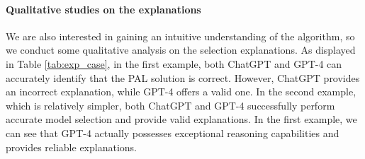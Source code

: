\documentclass[11pt]{article}
\begin{document}
\paragraph{Qualitative studies on the explanations}
We are also interested in gaining an intuitive understanding of the algorithm, so we conduct some qualitative analysis on the selection explanations. As displayed in Table \ref{tab:exp_case}, in the first example, both ChatGPT and GPT-4 can accurately identify that the PAL solution is correct. However, ChatGPT provides an incorrect explanation, while GPT-4 offers a valid one. 
In the second example, which is relatively simpler, both ChatGPT and GPT-4 successfully perform accurate model selection and provide valid explanations.
In the first example, we can see that GPT-4 actually possesses exceptional reasoning capabilities and provides reliable explanations.
\end{document}
